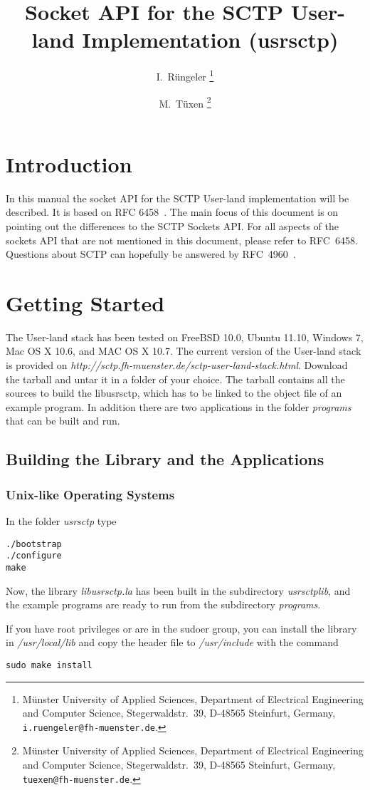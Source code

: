 \documentclass[a4paper]{article}
\title{Socket API for the SCTP User-land Implementation (usrsctp)}
\author{I.~R\"ungeler%
        \thanks{M\"unster University of Applied Sciences,
                Department of Electrical Engineering
                and Computer Science,
                Stegerwaldstr.~39,
                D-48565 Steinfurt,
                Germany,
                \texttt{i.ruengeler@fh-muenster.de}.}
        \and
        M.~T\"uxen%
        \thanks{M\"unster University of Applied Sciences,
                Department of Electrical Engineering
                and Computer Science,
                Stegerwaldstr.~39,
                D-48565 Steinfurt,
                Germany,
                \texttt{tuexen@fh-muenster.de}.}
}
\begin{document}
\setcounter{secnumdepth}{4}
\setcounter{tocdepth}{4}
\maketitle
\tableofcontents

\section{Introduction}
In this manual the socket API for the SCTP User-land implementation will be described. 
It is based on RFC 6458~\cite{socketAPI}. The main focus of this document is on pointing out
 the differences to the SCTP Sockets API. For all aspects of the sockets API that are not
 mentioned in this document, please refer to RFC~6458. Questions about SCTP can hopefully be
 answered by RFC~4960~\cite{SCTP}.
 
\section{Getting Started}
The User-land stack has been tested on FreeBSD 10.0, Ubuntu 11.10, Windows 7, Mac OS X 10.6, 
and MAC OS X 10.7.
The current version of the User-land stack is provided on \textit{http://sctp.fh-muenster.de/sctp-user-land-stack.html}.
Download the tarball and untar it in a folder of your choice. 
The tarball contains all the sources to build the libusrsctp, which has to be linked to the object file of an 
example program. In addition there are two applications in the folder \textit{programs} that can be built and run.
 
\subsection{Building the Library and the Applications}
\subsubsection{Unix-like Operating Systems}
In the folder \textit{usrsctp} type
\begin{verbatim}
./bootstrap
./configure
make
\end{verbatim}
Now, the library \textit{libusrsctp.la} has been built in the subdirectory \textit{usrsctplib}, and the example 
programs are ready to run from the subdirectory \textit{programs}.

If you have root privileges or are in the sudoer group, you can install the library in \textit{/usr/local/lib} 
and copy the header file to \textit{/usr/include} with the command
\begin{verbatim}
sudo make install
\end{verbatim}
\end{document}
